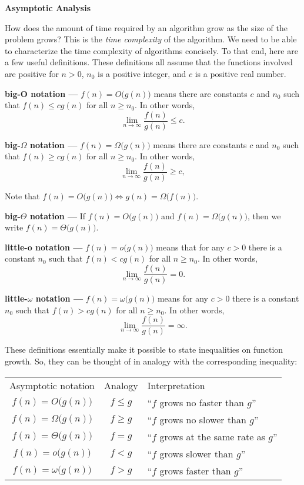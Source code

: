 \documentclass{article}
\begin{document}
{\Large\bf Asymptotic Analysis}

How does the amount of time required by an algorithm
grow as the size of the problem grows?
This is the \textit{time complexity} of the algorithm.
We need to be able to characterize the time complexity of algorithms
concisely. To that end, here are a few useful definitions.
These definitions all assume that the functions involved are positive for
$n>0$, $n_0$ is a positive integer, and $c$ is a positive real number.

{\large\bf big-O notation ---}
$f(n)=O\big(g(n)\big)$ means there are constants
$c$ and $n_0$
such that
$f(n) \le cg(n)$
for all $n\ge n_0$.
In other words,
\[
  \lim_{n\rightarrow\infty} \frac{f(n)}{g(n)} \le c .
\]

{\large\bf big-$\Omega$ notation ---}
$f(n)=\Omega\big(g(n)\big)$ means there are constants
$c$ and $n_0$
such that
$f(n) \ge cg(n)$
for all $n\ge n_0$.
In other words,
\[
  \lim_{n\rightarrow\infty} \frac{f(n)}{g(n)} \ge c,
\]

Note that
$f(n)=O\big(g(n)\big) \Longleftrightarrow g(n)=\Omega\big(f(n)\big)$.

{\large\bf big-$\Theta$ notation ---}
If
$f(n)=O\big(g(n)\big)$
and
$f(n)=\Omega\big(g(n)\big)$,
then we write
$f(n)=\Theta\big(g(n)\big)$.

{\large\bf little-o notation ---}
$f(n)=o\big(g(n)\big)$ means that for any $c>0$ there is a constant
$n_0$
such that
$f(n) < cg(n)$
for all $n\ge n_0$.
In other words,
\[
  \lim_{n\rightarrow\infty} \frac{f(n)}{g(n)} = 0 .
\]

{\large\bf little-$\omega$ notation ---}
$f(n)=\omega\big(g(n)\big)$ means for any $c>0$ there is a constant
$n_0$
such that
$f(n) > cg(n)$
for all $n\ge n_0$.
In other words,
\[
  \lim_{n\rightarrow\infty} \frac{f(n)}{g(n)} = \infty .
\]

These definitions essentially make it possible to state
inequalities on function growth. So, they can be thought
of in analogy with the corresponding inequality:

\begin{tabular}{ccl}
 Asymptotic notation         & Analogy  & Interpretation \\
 $f(n)=O\big(g(n)\big)$      & $f\le g$ & ``$f$ grows no faster than $g$''      \\
 $f(n)=\Omega\big(g(n)\big)$ & $f\ge g$ & ``$f$ grows no slower than $g$''      \\
 $f(n)=\Theta\big(g(n)\big)$ & $f=g$    & ``$f$ grows at the same rate as $g$'' \\
 $f(n)=o\big(g(n)\big)$      & $f<g$    & ``$f$ grows slower than $g$''    \\
 $f(n)=\omega\big(g(n)\big)$ & $f>g$    & ``$f$ grows faster than $g$''   \\
\end{tabular}
\end{document}
